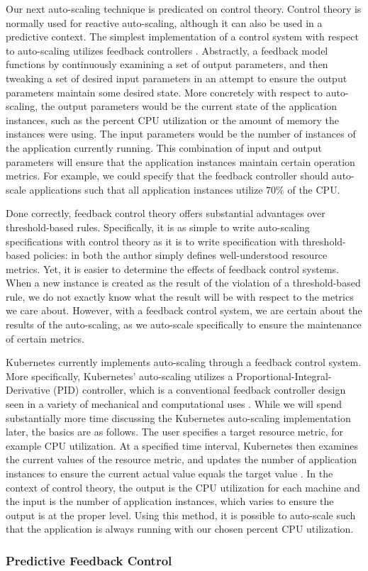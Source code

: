Our next auto-scaling technique is predicated on control
theory. Control theory is normally used for reactive auto-scaling, although it
can also be used in a predictive context. The simplest implementation of a
control system with respect to auto-scaling utilizes feedback
controllers
\cite{auto-scaling-techniques-for-elastic-applications-in-cloud-environments}.
Abstractly, a feedback model functions by continuously examining a set of output parameters,
and then tweaking a set of desired input parameters in an attempt to ensure the
output parameters maintain some desired state. More concretely with respect to
auto-scaling, the output parameters would be the current state of the
application instances, such as the percent CPU utilization or the amount of
memory the instances were using. The input parameters would be the
number of instances of the application currently running. This combination of
input and output parameters will ensure that the
application instances maintain certain operation metrics. For example, we could
specify that the feedback controller should auto-scale applications such that
all application instances utilize $70\%$ of the CPU.

Done correctly, feedback control theory offers substantial advantages over
threshold-based rules. Specifically, it is as simple to write auto-scaling
specifications with control theory as it is to write specification with
threshold-based policies: in both the author simply defines well-understood
resource metrics. Yet, it is easier to determine the effects of feedback
control systems. When a new instance is created as the result of the violation
of a threshold-based rule, we do not exactly know what the result will be with
respect to the metrics we care about. However, with a feedback control system,
we are certain about the results of the auto-scaling, as we auto-scale
specifically to ensure the maintenance of certain metrics.

Kubernetes currently implements auto-scaling through a feedback control system.
More specifically, Kubernetes' auto-scaling utilizes a
Proportional-Integral-Derivative (PID) controller, which is a
conventional feedback controller design seen in a variety of mechanical and
computational uses \cite{pid-controller}.
While we will spend substantially more time discussing the Kubernetes auto-scaling
implementation later, the basics are as follows. The user specifies a target resource
metric, for example CPU utilization. At a specified time interval,
Kubernetes then examines the current values
of the resource metric, and updates the number of application instances to
ensure the current actual value equals the target
value \cite{k8s-horizontal-pod-autoscaler-proposal}. In the context of control
theory, the output is the CPU utilization for each machine and the input is the
number of application instances, which varies to ensure the output is at the
proper level. Using this method, it is possible to auto-scale such that the
application is always running with our chosen percent CPU utilization.

\subsubsection{Predictive Feedback Control}


